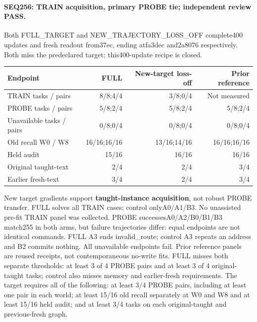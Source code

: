 \documentclass[11pt]{article}
\begin{document}
\paragraph{SEQ256: TRAIN acquisition, primary PROBE tie; independent review PASS.}
Both FULL\_TARGET and NEW\_TRAJECTORY\_LOSS\_OFF complete400 updates and fresh
readout from37ec, ending atfa3dec and2a8076 respectively. Both miss the
predeclared target; this400-update recipe is closed.
\begin{center}
\small
\begin{tabular}{lrrr}
\toprule
Endpoint & FULL & New-target loss-off & Prior reference \\
\midrule
TRAIN tasks / pairs & 8/8;4/4 & 3/8;0/4 & Not measured \\
PROBE tasks / pairs & 5/8;2/4 & 5/8;2/4 & 5/8;2/4 \\
Unavailable tasks / pairs & 0/8;0/4 & 0/8;0/4 & 0/8;0/4 \\
Old recall W0 / W8 & 16/16;16/16 & 13/16;14/16 & 16/16;16/16 \\
Held audit & 15/16 & 16/16 & 16/16 \\
Original taught-text & 2/4 & 2/4 & 3/4 \\
Earlier fresh-text & 3/4 & 2/4 & 3/4 \\
\bottomrule
\end{tabular}
\end{center}
New target gradients support \textbf{taught-instance acquisition}, not robust
PROBE transfer. FULL solves all TRAIN cases; control onlyA0/A1/B3. No unassisted
pre-fit TRAIN panel was collected. PROBE successesA0/A2/B0/B1/B3 match255 in
both arms, but failure trajectories differ: equal endpoints are not identical
commands. FULL A3 ends invalid\_route; control A3 repeats an address and B2
commits nothing. All unavailable endpoints fail. Prior reference panels are
reused receipts, not contemporaneous no-write fits. FULL misses both separate
thresholds: at least 3 of 4 PROBE pairs and at least 3 of 4 original-taught tasks;
control also misses memory and earlier-fresh requirements.
The target requires all of the following: at least 3/4 PROBE pairs, including
at least one pair in each world; at least 15/16 old recall separately at W0
and W8 and at least 15/16 held audit; and at least 3/4 tasks on each
original-taught and previous-fresh graph.
\end{document}

